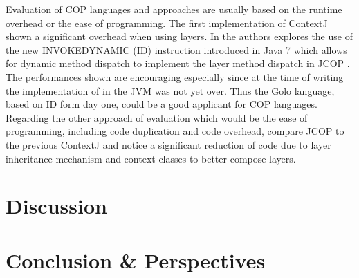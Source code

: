 \documentclass[a4paper]{article}
\begin{document}
Evaluation of COP languages and approaches are usually based on the runtime overhead or the ease of programming. The first implementation of ContextJ \cite{haupt_contextj:_2011} shown a significant overhead when using layers. In \cite{appeltauer_layered_2010} the authors explores the use of the new INVOKEDYNAMIC (ID) instruction introduced in Java 7 which allows for dynamic method dispatch to implement the layer method dispatch in JCOP \cite{appeltauer_declarative_2013}. The performances shown are encouraging especially since at the time of writing the implementation of in the JVM was not yet over. Thus the Golo language, based on ID form day one, could be a good applicant for COP languages. Regarding the other approach of evaluation which would be the ease of programming, including code duplication and code overhead, \cite{appeltauer_declarative_2013} compare JCOP to the previous ContextJ and notice a significant reduction of code due to layer inheritance mechanism and context classes to better compose layers.

\section{Discussion}
\label{section:discussion}

\section{Conclusion \& Perspectives}
\label{section:conclusion}


%
%



\end{document}
